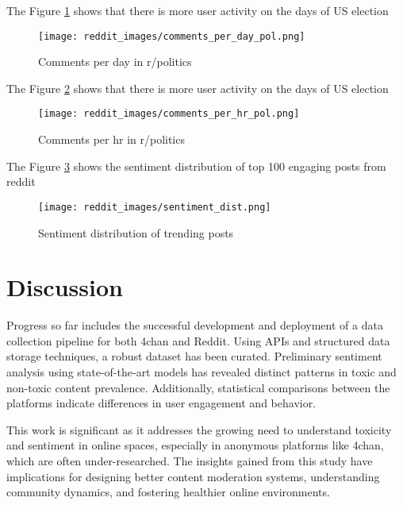 \documentclass[sigconf]{acmart}
\begin{document}
The Figure \ref{fig:reddit_images/comments_per_day_pol} shows that there is more user activity on the days of US election\newline
\begin{figure}[h]
    \centering
    \texttt{[image: reddit\_images/comments\_per\_day\_pol.png]} %
    \caption{Comments per day in r/politics}
    \label{fig:reddit_images/comments_per_day_pol}
\end{figure}


The Figure \ref{fig:reddit_images/comments_per_hr_pol} shows that there is more user activity on the days of US election\newline
\begin{figure}[h]
    \centering
    \texttt{[image: reddit\_images/comments\_per\_hr\_pol.png]} %
    \caption{Comments per hr in r/politics}
    \label{fig:reddit_images/comments_per_hr_pol}
\end{figure}


The Figure \ref{fig:reddit_images/sentiment_dist} shows the sentiment distribution of top 100 engaging posts from reddit\newline
\begin{figure}[h]
    \centering
    \texttt{[image: reddit\_images/sentiment\_dist.png]} %
    \caption{Sentiment distribution of trending posts}
    \label{fig:reddit_images/sentiment_dist}
\end{figure}

\section{Discussion}
Progress so far includes the successful development and deployment of a data collection pipeline for both 4chan and Reddit. Using APIs and structured data storage techniques, a robust dataset has been curated. Preliminary sentiment analysis using state-of-the-art models has revealed distinct patterns in toxic and non-toxic content prevalence. Additionally, statistical comparisons between the platforms indicate differences in user engagement and behavior.

This work is significant as it addresses the growing need to understand toxicity and sentiment in online spaces, especially in anonymous platforms like 4chan, which are often under-researched. The insights gained from this study have implications for designing better content moderation systems, understanding community dynamics, and fostering healthier online environments.
\end{document}
